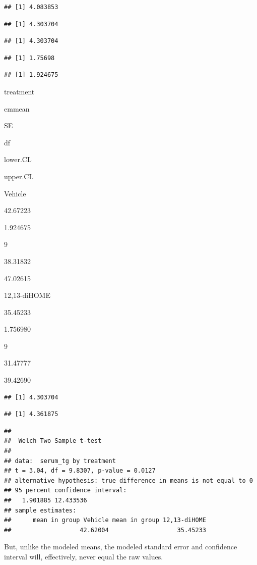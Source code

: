 \documentclass[]{book}
\begin{document}
\begin{verbatim}
## [1] 4.083853
\end{verbatim}

\begin{verbatim}
## [1] 4.303704
\end{verbatim}

\begin{verbatim}
## [1] 4.303704
\end{verbatim}

\begin{verbatim}
## [1] 1.75698
\end{verbatim}

\begin{verbatim}
## [1] 1.924675
\end{verbatim}

treatment

emmean

SE

df

lower.CL

upper.CL

Vehicle

42.67223

1.924675

9

38.31832

47.02615

12,13-diHOME

35.45233

1.756980

9

31.47777

39.42690

\begin{verbatim}
## [1] 4.303704
\end{verbatim}

\begin{verbatim}
## [1] 4.361875
\end{verbatim}

\begin{verbatim}
## 
##  Welch Two Sample t-test
## 
## data:  serum_tg by treatment
## t = 3.04, df = 9.8307, p-value = 0.0127
## alternative hypothesis: true difference in means is not equal to 0
## 95 percent confidence interval:
##   1.901885 12.433536
## sample estimates:
##      mean in group Vehicle mean in group 12,13-diHOME 
##                   42.62004                   35.45233
\end{verbatim}

But, unlike the modeled means, the modeled standard error and confidence interval will, effectively, never equal the raw values.
\end{document}
